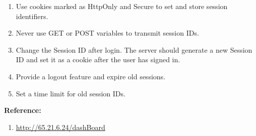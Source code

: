 \documentclass{article}
\begin{document}
\begin{description}[itemsep=2pt, leftmargin=0.2cm]
\begin{enumerate}[leftmargin=0.5cm]
                                \item \large  Use cookies marked as HttpOnly and Secure to set and store session identifiers.

                                \item \large  Never use GET or POST variables to transmit session IDs.

                                \item \large  Change the Session ID after login. The server should generate a new Session ID and set it as a cookie after the user has signed in.

                                \item \large Provide a logout feature and expire old sessions.

                                \item \large  Set a time limit for old session IDs.
                            \end{enumerate}

                    \item \large \textbf{Reference:}
                            \linespread{1.0}
                            \begin{enumerate}[leftmargin=0.5cm, ]
                                
                            \item \large \underline{\href{http://65.21.6.24/dashBoard} {http://65.21.6.24/dashBoard}}
                            \end{enumerate}
                    
                \end{description}

                \newpage
\end{document}
